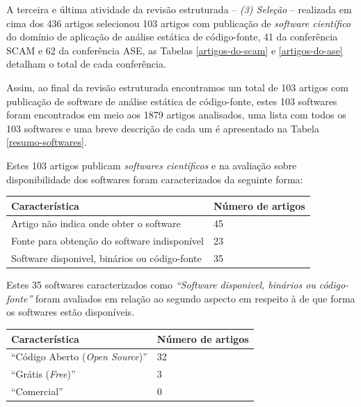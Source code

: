 A terceira e última atividade da revisão estruturada -- {\it (3) Seleção} --
realizada em cima dos 436 artigos selecionou 103 artigos com publicação de {\it software
científico} do domínio de aplicação de análise estática de código-fonte, 41 da
conferência SCAM e 62 da conferência ASE, as Tabelas \ref{artigos-do-scam} e
\ref{artigos-do-ase} detalham o total de cada conferência.

Assim, ao final da revisão estruturada encontramos um total de 103 artigos com
publicação de software de análise estática de código-fonte, estes 103 softwares
foram encontrados em meio aos 1879 artigos analisados,
uma lista com todos os 103 softwares e uma breve descrição de cada um é
apresentado na Tabela \ref{resumo-softwares}.

Estes 103 artigos publicam {\it softwares científicos} e na avaliação sobre
disponibilidade dos softwares foram caracterizados da seguinte forma: %

\begin{table}[H]
\centering
\begin{tabular}{| l | l |}
  \hline
  {\bf Característica}                          & {\bf Número de artigos} \\
  \hline
  Artigo não indica onde obter o software       & 45 \\
  \hline
  Fonte para obtenção do software indisponível  & 23 \\
  \hline
  Software disponivel, binários ou código-fonte & 35 \\
  \hline
\end{tabular}
\end{table}

Estes 35 softwares caracterizados como {\it ``Software disponivel, binários ou
código-fonte''} foram avaliados em relação ao segundo aspecto em respeito à de
que forma os softwares estão disponíveis.

\begin{table}[H]
\centering
\begin{tabular}{| l | l |}
  \hline
  {\bf Característica}                          & {\bf Número de artigos} \\
  \hline
  ``Código Aberto ({\it Open Source})''         & 32 \\
  \hline
  ``Grátis ({\it Free})''                       & 3  \\
  \hline
  ``Comercial''                                 & 0  \\
  \hline
\end{tabular}
\end{table}

